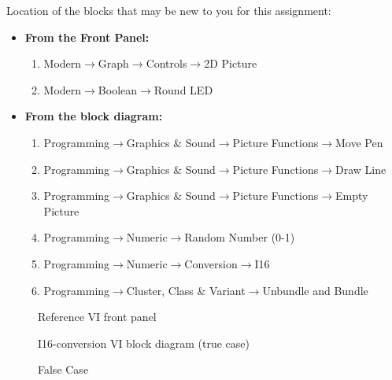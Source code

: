\documentclass[11pt]{article}
\begin{document}
Location of the blocks that may be new to you for this assignment:
%
\begin{itemize}
    \item \textbf{From the Front Panel:}
        \begin{enumerate}
            \item Modern$\rightarrow$Graph$\rightarrow$Controls$\rightarrow$2D Picture
            \item Modern$\rightarrow$Boolean$\rightarrow$Round LED
        \end{enumerate}
    \item \textbf{From the block diagram:}
        \begin{enumerate}
            \item Programming$\rightarrow$Graphics \& Sound$\rightarrow$Picture Functions$\rightarrow$Move Pen
            \item Programming$\rightarrow$Graphics \& Sound$\rightarrow$Picture Functions$\rightarrow$Draw Line
            \item Programming$\rightarrow$Graphics \& Sound$\rightarrow$Picture Functions$\rightarrow$Empty Picture
            \item Programming$\rightarrow$Numeric$\rightarrow$Random Number (0-1)
            \item Programming$\rightarrow$Numeric$\rightarrow$Conversion$\rightarrow$I16
            \item Programming$\rightarrow$Cluster, Class \& Variant$\rightarrow$Unbundle and Bundle
        \end{enumerate}
\end{itemize}
%
\begin{figure}[H]
    \centering
    \caption{Reference VI front panel}
\end{figure}
%
\begin{landscape}
    \begin{figure}[H]
        \centering
        \caption{I16-conversion VI block diagram (true case)}
    \end{figure}
    \begin{figure}[H]
        \centering
        \caption{False Case}
    \end{figure}
\end{landscape}
%
\end{document}

